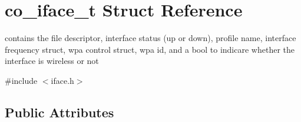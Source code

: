 \hypertarget{structco__iface__t}{\section{co\-\_\-iface\-\_\-t Struct Reference}
\label{structco__iface__t}
}


contains the file descriptor, interface status (up or down), profile name, interface frequency struct, wpa control struct, wpa id, and a bool to indicare whether the interface is wireless or not  




{\ttfamily \#include $<$iface.\-h$>$}

\subsection*{Public Attributes}
